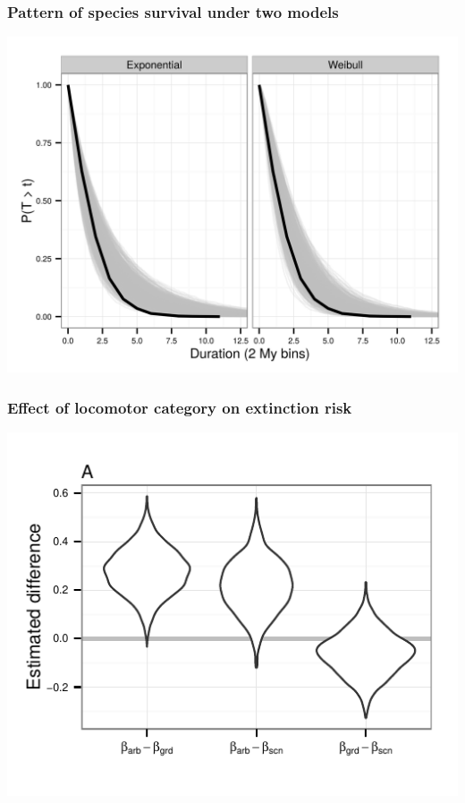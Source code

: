\documentclass{beamer}
\begin{document}
\begin{frame}
  \frametitle{Pattern of species survival under two models}

  \begin{center}
    \includegraphics[height=0.75\textheight,keepaspectratio=true]{figure/survival_function_pres}
  \end{center}

  \tiny{}
\end{frame}

\begin{frame}
  \frametitle{Effect of locomotor category on extinction risk}

  \begin{center}
    \includegraphics[height=0.75\textheight,keepaspectratio=true]{figure/loco_diff_est}
  \end{center}

  \tiny{}
\end{frame}
\end{document}
